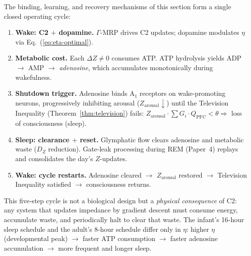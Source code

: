 \documentclass[aps,pre,twocolumn,superscriptaddress,floatfix]{revtex4-2}
\begin{document}
\begin{remark}
\label{rem:neural-cycle}
The binding, learning, and recovery mechanisms of this
section form a single closed operating cycle:
\begin{enumerate}
  \item \textbf{Wake: C2 $+$ dopamine.}
    $\Gamma$-MRP drives C2 updates; dopamine modulates
    $\eta$ via Eq.~(\ref{eq:eta-optimal}).
  \item \textbf{Metabolic cost.}
    Each $\Delta Z \neq 0$ consumes ATP.
    ATP hydrolysis yields ADP $\to$ AMP $\to$
    \emph{adenosine}, which accumulates monotonically
    during wakefulness.
  \item \textbf{Shutdown trigger.}
    Adenosine binds A$_1$ receptors on wake-promoting
    neurons, progressively inhibiting arousal
    ($Z_{\text{arousal}} \downarrow$) until the
    Television Inequality
    (Theorem~\ref{thm:television}) fails:
    $Z_{\text{arousal}} \cdot \sum G_i \cdot Q_{\text{PFC}}
    < \theta \Rightarrow$ loss of consciousness (sleep).
  \item \textbf{Sleep: clearance $+$ reset.}
    Glymphatic flow clears adenosine and metabolic
    waste ($D_Z$ reduction).
    Gate-leak processing during REM (Paper~4) replays
    and consolidates the day's $Z$-updates.
  \item \textbf{Wake: cycle restarts.}
    Adenosine cleared $\to$ $Z_{\text{arousal}}$
    restored $\to$ Television Inequality satisfied
    $\to$ consciousness returns.
\end{enumerate}
This five-step cycle is not a biological design but a
\emph{physical consequence} of C2: any system that
updates impedance by gradient descent must consume
energy, accumulate waste, and periodically halt to
clear that waste.
The infant's 16-hour sleep schedule and the adult's
8-hour schedule differ only in $\eta$: higher $\eta$
(developmental peak) $\to$ faster ATP consumption $\to$
faster adenosine accumulation $\to$ more frequent and
longer sleep.
\end{remark}
\end{document}
